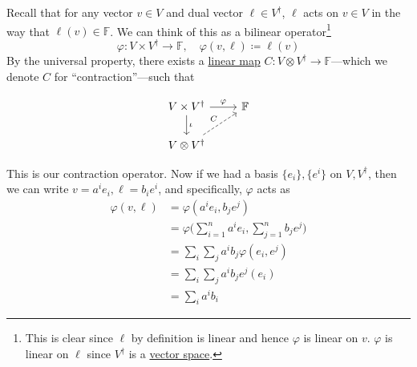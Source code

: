 	\begin{example}
	  \label{ex:contraction-of-rank-1-1-tensor}
		Recall that for any vector $v \in V$ and dual vector $\ell \in V^\dagger$, $\ell$ acts on $v \in V$ in the way that $\ell(v) \in \mathbb{F}$. We can think of this as a bilinear operator\footnote{This is clear since $\ell$ by definition is linear and hence $\varphi$ is linear on $v$. $\varphi$ is linear on $\ell$ since $V^\dagger$ is a \hyperref[def:vector-space]{vector space}.}
		\begin{equation}
			\varphi: V \times V^\dagger \to \mathbb{F}, \quad \varphi(v, \ell) \coloneqq \ell(v)
		\end{equation}
		By the universal property, there exists a \hyperref[def:linear_map]{linear map} $C:V \otimes V^\dagger \to \mathbb{F}$---which we denote $C$ for ``contraction''---such that 

		\begin{figure}[H]
			\centering 
			\begin{equation}
			  \begin{tikzcd}
			  				V \times V^\dagger \arrow[r, "\varphi"] \arrow[d, "\iota"] & \mathbb{F} \\
			  				V \otimes V^\dagger \arrow[ru, dashed, "C"]
			  			\end{tikzcd}
			\end{equation}
			\caption{} 
		\end{figure}

		This is our contraction operator. Now if we had a basis $\{e_i\}, \{e^i\}$ on $V, V^\dagger$, then we can write $v = a^i e_i, \ell = b_i e^i$, and specifically, $\varphi$ acts as
		\begin{align}
			\varphi(v, \ell) & = \varphi(a^i e_i, b_j e^j) \\ 
											 & = \varphi \bigg( \sum_{i=1}^n a^i e_i, \sum_{j=1}^n b_j e^j \bigg) \\ 
											 & = \sum_i \sum_j a^i b_j \varphi(e_i, e^j) \\ 
											 & = \sum_i \sum_j a^i b_j e^j (e_i) \\ 
											 & = \sum_i a^i b_i 
		\end{align}


\end{example}
